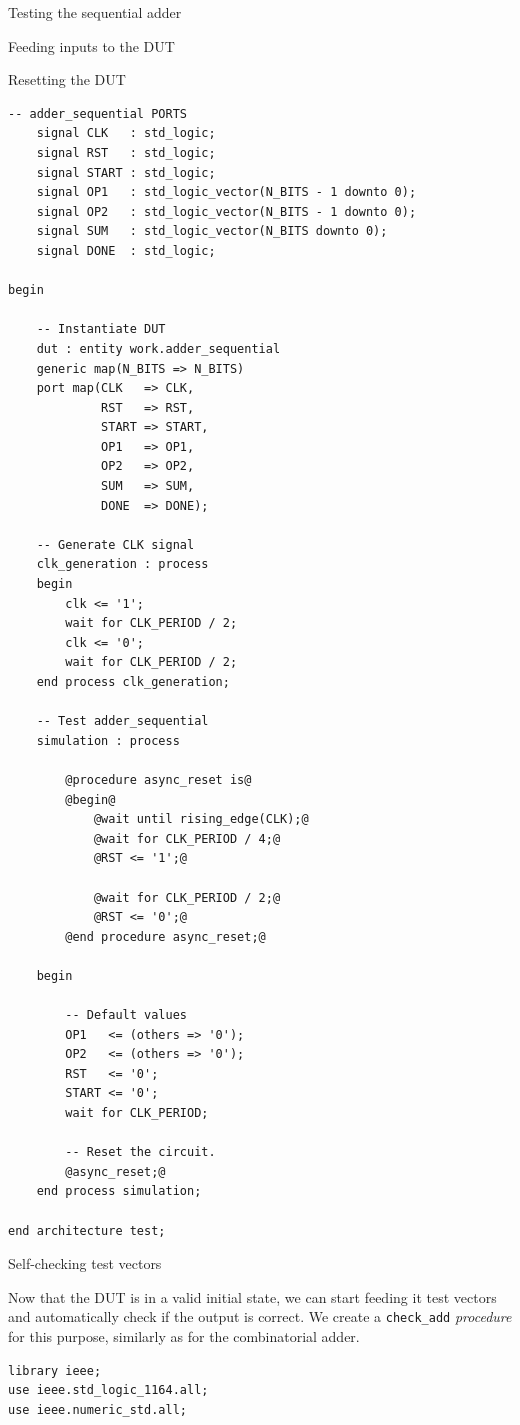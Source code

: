 \documentclass[lab]{course}
\begin{document}
\begin{section}{Testing the sequential adder}
\begin{subsection}{Feeding inputs to the DUT}
\begin{subsubsection}{Resetting the DUT}
\begin{lstlisting}[caption={Add \emph{asynchronous} reset}, label={lst:sequential_process_simulation_async_reset}]
    -- adder_sequential PORTS
    signal CLK   : std_logic;
    signal RST   : std_logic;
    signal START : std_logic;
    signal OP1   : std_logic_vector(N_BITS - 1 downto 0);
    signal OP2   : std_logic_vector(N_BITS - 1 downto 0);
    signal SUM   : std_logic_vector(N_BITS downto 0);
    signal DONE  : std_logic;

begin

    -- Instantiate DUT
    dut : entity work.adder_sequential
    generic map(N_BITS => N_BITS)
    port map(CLK   => CLK,
             RST   => RST,
             START => START,
             OP1   => OP1,
             OP2   => OP2,
             SUM   => SUM,
             DONE  => DONE);

    -- Generate CLK signal
    clk_generation : process
    begin
        clk <= '1';
        wait for CLK_PERIOD / 2;
        clk <= '0';
        wait for CLK_PERIOD / 2;
    end process clk_generation;

    -- Test adder_sequential
    simulation : process

        @procedure async_reset is@
        @begin@
            @wait until rising_edge(CLK);@
            @wait for CLK_PERIOD / 4;@
            @RST <= '1';@

            @wait for CLK_PERIOD / 2;@
            @RST <= '0';@
        @end procedure async_reset;@

    begin

        -- Default values
        OP1   <= (others => '0');
        OP2   <= (others => '0');
        RST   <= '0';
        START <= '0';
        wait for CLK_PERIOD;

        -- Reset the circuit.
        @async_reset;@
    end process simulation;

end architecture test;
            \end{lstlisting}
        \end{subsubsection}

        \begin{subsubsection}{Self-checking test vectors}

            Now that the DUT is in a valid initial state, we can start feeding it test vectors and automatically check if the output is correct. We create a \verb+check_add+ \emph{procedure} for this purpose, similarly as for the combinatorial adder.

            \begin{lstlisting}[caption={Add test vectors}, label={lst:sequential_process_simulation_test_vectors}]
library ieee;
use ieee.std_logic_1164.all;
use ieee.numeric_std.all;


\end{lstlisting}
\end{subsubsection}
\end{subsection}
\end{section}
\end{document}
